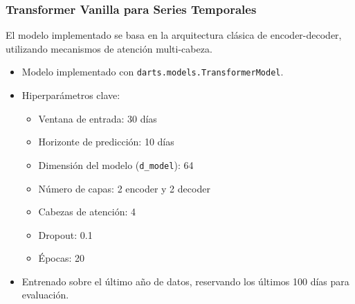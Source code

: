 \documentclass[12pt]{article}
\begin{document}



\subsubsection{Transformer Vanilla para Series Temporales}

El modelo implementado se basa en la arquitectura clásica de encoder-decoder, utilizando mecanismos de atención multi-cabeza.

\begin{itemize}
\item Modelo implementado con \texttt{darts.models.TransformerModel}.
\item Hiperparámetros clave:
\begin{itemize}
\item Ventana de entrada: 30 días
\item Horizonte de predicción: 10 días
\item Dimensión del modelo (\texttt{d\_model}): 64
\item Número de capas: 2 encoder y 2 decoder
\item Cabezas de atención: 4
\item Dropout: 0.1
\item Épocas: 20
\end{itemize}
\item Entrenado sobre el último año de datos, reservando los últimos 100 días para evaluación.
\end{itemize}
\end{document}
